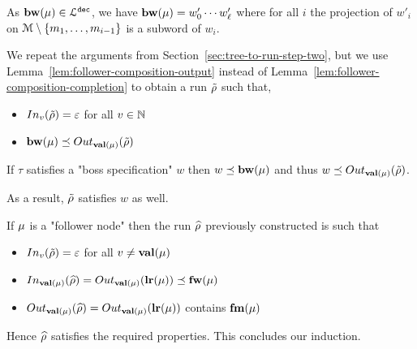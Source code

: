 As $\mathbf{bw}(\mu) \in \mathcal{L}^{\mathtt{\mathtt{dec}}}$, we have $\mathbf{bw}(\mu) = w'_0 \cdots w'_\ell$ where for all $i$ the projection of $w'_i$ on $\mathcal{M}\setminus\{m_1, \ldots, m_{i-1}\}$ is a subword of $w_i$. 

We repeat the arguments from Section~\ref{sec:tree-to-run-step-two}, but we use Lemma~\ref{lem:follower-composition-output} instead of Lemma~\ref{lem:follower-composition-completion} to obtain a run $\Tilde{\rho}$ such that,
\begin{itemize}	
	\item $\vinput{v}{\Tilde{\run}} = \epsilon$ for all $v \in \mathbb{N}$
	
	\item $\bosslabel{\node} \subword \voutput{\valuelabel{\node}}{\Tilde{\run}}$
\end{itemize}

If $\tau$ satisfies a "boss specification" $w$  then $w \preceq \mathbf{bw}(\mu) $ and thus $w \subword \voutput{\valuelabel{\node}}{\Tilde{\run}}$.

As a result, $\Tilde{\rho}$ satisfies $w$ as well.

If $\mu$ is a "follower node" then the run $\widehat{\rho}$ previously constructed is such that  

\begin{itemize}	
	\item $\vinput{v}{\Tilde{\run}} = \epsilon$ for all $v \neq \mathbf{val}(\mu)$
	
	\item $\vinput{\valuelabel{\node}}{\widehat{\run}} = \voutput{\valuelabel{\node}}{\localrunlabel{\node}} \subword \followlabelword{\node}$
	
	\item $\voutput{\valuelabel{\node}}{\widehat{\run}} = \voutput{\valuelabel{\node}}{\localrunlabel{\node}}$ contains $\mathbf{fm}(\mu)$
\end{itemize}

Hence $\widehat{\rho}$ satisfies the required properties.
This concludes our induction.